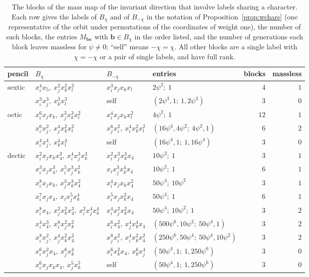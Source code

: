 \documentclass[11pt]{amsart}
\theoremstyle{definition}
\theoremstyle{remark}
\newcommand{\bb}{\mathbf{b}}
\newcommand{\cc}{\mathbf{c}}
\begin{document}
\begin{table}[t]
\caption{The blocks of the mass map of the invariant direction that
involve labels sharing a character. Each row gives the labels of
$B_\chi$ and of $B_{-\chi}$ in the notation of
Proposition~\ref{prop:wchars} (one representative of the orbit under
permutations of the coordinates of weight one), the number of such blocks,
the entries $M_{\bb\cc}$ with $\bb\in B_\chi$ in the order listed, and the
number of generations each block leaves massless for $\psi\ne0$; ``self''
means $-\chi=\chi$. All other blocks are a single label with $\chi=-\chi$
or a pair of single labels, and have full rank.}
\label{tab:wblocks}
\centering
\begin{tabular}{llllrr}
\toprule
pencil & $B_\chi$ & $B_{-\chi}$ & entries & blocks & massless\\
\midrule
sextic & $x_i^4x_5,\ x_j^2x_k^2x_l^2$ & $x_i^3x_jx_kx_l$ &
$2\psi^2;\ 1$ & $4$ & $1$\\
 & $x_i^3x_j^3,\ x_k^3x_l^3$ & self & $(2\psi^3,1;\ 1,2\psi^3)$ & $3$ & $0$\\
\midrule
octic & $x_i^6x_jx_k,\ x_j^3x_k^3x_l^2$ & $x_i^4x_jx_kx_l^2$ &
$4\psi^2;\ 1$ & $12$ & $1$\\
 & $x_i^6x_j^2,\ x_j^4x_k^2x_l^2$ & $x_j^6x_i^2,\ x_i^4x_k^2x_l^2$ &
$(16\psi^4,4\psi^2;\ 4\psi^2,1)$ & $6$ & $2$\\
 & $x_i^4x_j^4,\ x_k^4x_l^4$ & self & $(16\psi^4,1;\ 1,16\psi^4)$ & $3$ & $0$\\
\midrule
dectic & $x_i^2x_jx_kx_4^3,\ x_i^4x_j^3x_k^3$ & $x_i^2x_j^3x_k^3x_4$ &
$10\psi^2;\ 1$ & $3$ & $1$\\
 & $x_i^3x_jx_4^3,\ x_i^5x_j^3x_k^2$ & $x_ix_j^3x_k^4x_4$ &
$10\psi^2;\ 1$ & $6$ & $1$\\
 & $x_i^8x_jx_k,\ x_j^3x_k^3x_4^2$ & $x_i^4x_jx_kx_4^2$ &
$50\psi^4;\ 10\psi^2$ & $3$ & $1$\\
 & $x_i^7x_jx_4,\ x_ix_j^5x_k^4$ & $x_i^5x_jx_k^2x_4$ &
$50\psi^4;\ 1$ & $6$ & $1$\\
 & $x_i^8x_4,\ x_j^2x_k^2x_4^3,\ x_i^2x_j^4x_k^4$ & $x_i^4x_j^2x_k^2x_4$ &
$50\psi^4;\ 10\psi^2;\ 1$ & $3$ & $2$\\
 & $x_i^4x_4^3,\ x_i^6x_j^2x_k^2$ & $x_i^6x_4^2,\ x_j^4x_k^4x_4$ &
$(500\psi^6,10\psi^2;\ 50\psi^4,1)$ & $3$ & $2$\\
 & $x_i^8x_j^2,\ x_j^4x_k^2x_4^2$ & $x_j^8x_i^2,\ x_i^4x_k^2x_4^2$ &
$(250\psi^6,50\psi^4;\ 50\psi^4,10\psi^2)$ & $3$ & $2$\\
 & $x_i^6x_j^2x_4,\ x_j^6x_k^4$ & $x_i^6x_k^2x_4,\ x_k^6x_j^4$ &
$(50\psi^4,1;\ 1,250\psi^6)$ & $3$ & $0$\\
 & $x_i^6x_jx_kx_4,\ x_j^5x_k^5$ & self & $(50\psi^4,1;\ 1,250\psi^6)$ & $3$ & $0$\\
\bottomrule
\end{tabular}
\end{table}
\end{document}
